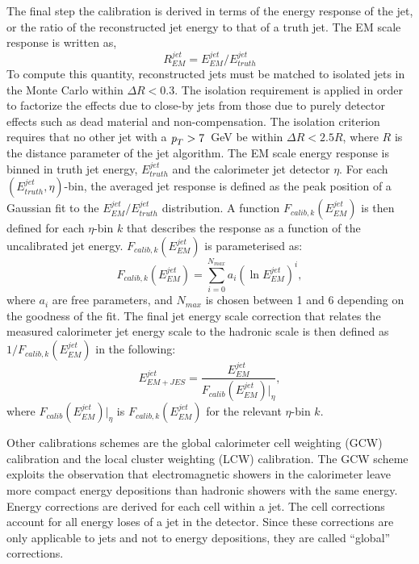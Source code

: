\begin{itemize}
The final step the calibration is derived in terms of the energy response of the jet, or the ratio of the reconstructed jet energy to that of a truth jet.  The EM scale response is written as,
%
\begin{equation}
R^{jet}_{EM} = E^{jet}_{EM} / E^{jet}_{truth}
\end{equation}
%
To compute this quantity, reconstructed jets must be matched to isolated jets in the Monte Carlo within $\Delta R < 0.3$. The isolation requirement is applied in order to factorize the effects due to close-by jets from those due to purely detector effects such as dead material and non-compensation. The isolation criterion requires that no other jet with a ${\emph{p}_{T}} > 7$~GeV be within $\Delta R < 2.5R$, where $R$ is the distance parameter of the jet algorithm. The EM scale energy response is binned in truth jet energy, $E^{jet}_{truth}$ and the calorimeter jet detector $\eta$.  For each $(E^{jet}_{truth}, \eta)$-bin, the averaged jet response is defined as the peak position of a Gaussian fit to the $E^{jet}_{EM} / E^{jet}_{truth}$ distribution.  A function $F_{calib,k}(E^{jet}_{EM})$ is then defined for each $\eta$-bin $k$ that describes the response as a function of the uncalibrated jet energy. $F_{calib,k}(E^{jet}_{EM})$ is parameterised as:
%
\begin{equation}
F_{calib,k}(E^{jet}_{EM}) = \sum_{i=0}^{N_{max}} a_i (\ln E^{jet}_{EM})^i,
\end{equation}
%
where $a_i$ are free parameters, and $N_{max}$ is chosen between 1 and 6 depending on the goodness of the fit. The final jet energy scale correction that relates the measured calorimeter jet energy scale to the hadronic scale is then defined as $1/F_{calib,k}(E^{jet}_{EM})$ in the following:
%
\begin{equation}
E^{jet}_{EM+JES} = \frac{E^{jet}_{EM}}{F_{calib}(E^{jet}_{EM})|_{\eta}},
\end{equation}
%
where $F_{calib}(E^{jet}_{EM})|_{\eta}$  is $F_{calib,k}(E^{jet}_{EM})$ for the relevant $\eta$-bin $k$.


Other calibrations schemes are the global calorimeter cell weighting (GCW) calibration and the local cluster weighting (LCW) calibration.  The GCW scheme exploits the observation that electromagnetic showers in the calorimeter leave more compact energy depositions than hadronic showers with the same energy.  Energy corrections are derived for each cell within a jet.  The cell corrections account for all energy loses of a jet in the detector. Since these corrections are only applicable to jets and not to energy depositions, they are called ``global'' corrections.


\end{itemize}
